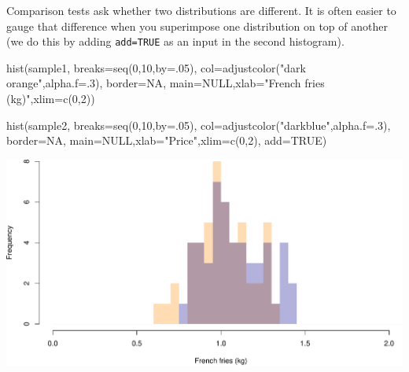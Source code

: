 \documentclass[
]{book}
\newenvironment{Shaded}{\begin{snugshade}}{\end{snugshade}}
\newcommand{\AttributeTok}[1]{\textcolor[rgb]{0.77,0.63,0.00}{#1}}
\newcommand{\ConstantTok}[1]{\textcolor[rgb]{0.00,0.00,0.00}{#1}}
\newcommand{\DecValTok}[1]{\textcolor[rgb]{0.00,0.00,0.81}{#1}}
\newcommand{\FunctionTok}[1]{\textcolor[rgb]{0.00,0.00,0.00}{#1}}
\newcommand{\NormalTok}[1]{#1}
\newcommand{\StringTok}[1]{\textcolor[rgb]{0.31,0.60,0.02}{#1}}
\begin{document}
Comparison tests ask whether two distributions are different. It is often easier to gauge that difference when you superimpose one distribution on top of another (we do this by adding \texttt{add=TRUE} as an input in the second histogram).

\begin{Shaded}
\begin{Highlighting}[]
\FunctionTok{hist}\NormalTok{(sample1,}
     \AttributeTok{breaks=}\FunctionTok{seq}\NormalTok{(}\DecValTok{0}\NormalTok{,}\DecValTok{10}\NormalTok{,}\AttributeTok{by=}\NormalTok{.}\DecValTok{05}\NormalTok{),}
     \AttributeTok{col=}\FunctionTok{adjustcolor}\NormalTok{(}\StringTok{"dark orange"}\NormalTok{,}\AttributeTok{alpha.f=}\NormalTok{.}\DecValTok{3}\NormalTok{),}
     \AttributeTok{border=}\ConstantTok{NA}\NormalTok{,}
     \AttributeTok{main=}\ConstantTok{NULL}\NormalTok{,}\AttributeTok{xlab=}\StringTok{"French fries (kg)"}\NormalTok{,}\AttributeTok{xlim=}\FunctionTok{c}\NormalTok{(}\DecValTok{0}\NormalTok{,}\DecValTok{2}\NormalTok{))}

\FunctionTok{hist}\NormalTok{(sample2,}
     \AttributeTok{breaks=}\FunctionTok{seq}\NormalTok{(}\DecValTok{0}\NormalTok{,}\DecValTok{10}\NormalTok{,}\AttributeTok{by=}\NormalTok{.}\DecValTok{05}\NormalTok{),}
     \AttributeTok{col=}\FunctionTok{adjustcolor}\NormalTok{(}\StringTok{"darkblue"}\NormalTok{,}\AttributeTok{alpha.f=}\NormalTok{.}\DecValTok{3}\NormalTok{),}
     \AttributeTok{border=}\ConstantTok{NA}\NormalTok{,}
     \AttributeTok{main=}\ConstantTok{NULL}\NormalTok{,}\AttributeTok{xlab=}\StringTok{"Price"}\NormalTok{,}\AttributeTok{xlim=}\FunctionTok{c}\NormalTok{(}\DecValTok{0}\NormalTok{,}\DecValTok{2}\NormalTok{),}
     \AttributeTok{add=}\ConstantTok{TRUE}\NormalTok{)}
\end{Highlighting}
\end{Shaded}

\includegraphics{figures/unnamed-chunk-228-1.pdf}
\end{document}
